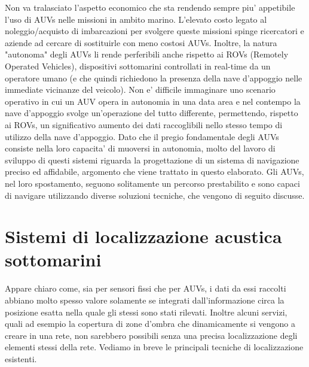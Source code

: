 Non va tralasciato l'aspetto economico che sta rendendo sempre piu' appetibile l'uso di AUVs nelle missioni in ambito marino. L'elevato costo legato al noleggio/acquisto di imbarcazioni per svolgere queste missioni spinge ricercatori e aziende ad cercare di sostituirle con meno costosi AUVs. Inoltre, la natura "autonoma" degli AUVs li rende perferibili anche rispetto ai ROVs (Remotely Operated Vehicles), dispositivi sottomarini controllati in real-time da un operatore umano (e che quindi richiedono la presenza della nave d'appoggio nelle immediate vicinanze del veicolo). Non e' difficile immaginare uno scenario operativo in cui un AUV opera in autonomia in una data area e nel contempo la nave d'appoggio svolge un'operazione del tutto differente, permettendo, rispetto ai ROVs, un significativo aumento dei dati raccoglibili nello stesso tempo di utilizzo della nave d'appoggio. \newline
Dato che il pregio fondamentale degli AUVs consiste nella loro capacita' di muoversi in autonomia, molto del lavoro di sviluppo di questi sistemi riguarda la progettazione di un sistema di navigazione preciso ed affidabile, argomento che viene trattato in questo elaborato.
Gli AUVs, nel loro spostamento, seguono solitamente un percorso prestabilito e sono capaci di navigare utilizzando diverse soluzioni tecniche, che vengono di seguito discusse.


\section{Sistemi di localizzazione acustica sottomarini}
Appare chiaro come, sia per sensori fissi che per AUVs, i dati da essi raccolti abbiano molto spesso valore solamente se integrati dall'informazione circa la posizione esatta nella quale gli stessi sono stati rilevati. Inoltre alcuni servizi, quali ad esempio la copertura di zone d'ombra che dinamicamente si vengono a creare in una rete, non sarebbero possibili senza una precisa localizzazione degli elementi stessi della rete.
Vediamo in breve le principali tecniche di localizzazione esistenti.

